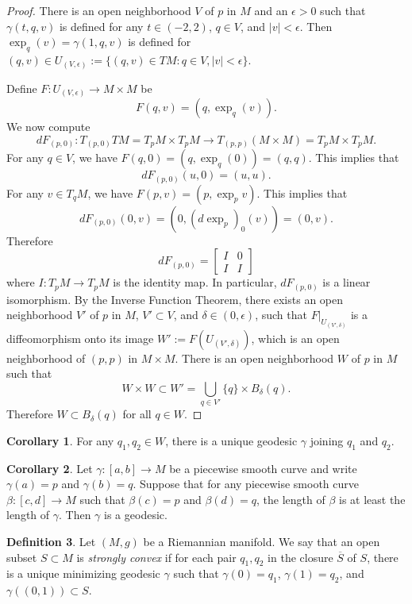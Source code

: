 \documentclass{amsart}
\numberwithin{equation}{section}
\theoremstyle{definition}
\newtheorem{definition}{Definition} [section]
\theoremstyle{theorem}
\newtheorem{corollary}[definition]{Corollary}
\begin{document}
\begin{proof}
There is an open neighborhood $V$ of $p$ in $M$ and an $\epsilon > 0$ such that $\gamma(t,q,v)$ is defined for any $t \in (-2,2)$,
$q\in V$, and $|v|<\epsilon$. Then $\exp_q(v) = \gamma(1, q,v)$ is defined for $(q,v)\in U_{(V,\epsilon)} := \{(q,v) \in TM : q \in V, |v| < \epsilon\}$. 

Define $F : U_{(V,\epsilon)}  \to M \times M$ be 
\[
F(q,v) = (q,\exp_q(v)).
\]
We now compute
$$
dF_{(p,0)}: T_{(p,0)}TM = T_p M\times T_p M \longrightarrow T_{(p,p)}(M\times M) = T_p M\times T_p M.
$$
For any $q \in V$, we have $F(q,0) = (q,\exp_q(0)) = (q,q)$. This implies that 
\[
dF_{(p,0)}(u,0) = (u,u).
\] 
For any $v \in T_qM$, we have $F(p,v) = (p, \exp_pv)$. This implies that 
\[
dF_{(p,0)}(0,v) = (0, (d\exp_p)_0(v)) = (0,v).
\]
Therefore  
\[
dF_{(p,0)} = \begin{bmatrix}
I & 0 \\ I & I 
\end{bmatrix}
\]
where $I: T_pM\to T_pM$ is the identity map. In particular, $dF_{(p,0)}$ is a linear isomorphism. By the Inverse Function Theorem,
there exists an open neighborhood $V'$ of $p$ in $M$, $V'\subset V$, and $\delta \in (0,\epsilon)$, such that
$F|_{U_{(V',\delta)}}$ is a diffeomorphism onto its image $W':= F(U_{(V',\delta)})$, which is an open neighborhood
of $(p,p)$ in $M\times M$.  There is an open neighborhood $W$ of $p$ in $M$ such that 
$$
W \times W \subset W'=\bigcup_{q\in V'}\{q\} \times B_\delta(q). 
$$
Therefore $W\subset B_\delta(q)$ for all $q\in W$.  
\end{proof}

\begin{corollary}
For any $q_1, q_2 \in W$, there is a unique geodesic $\gamma$ joining $q_1$ and $q_2$. 
\end{corollary}

\begin{corollary}
Let $\gamma : [a,b] \to M$ be a piecewise smooth curve and write $\gamma(a) = p$ and $\gamma(b) = q$. Suppose that for any piecewise smooth curve $\beta : [c,d] \to M$ such that $\beta(c) = p$ and $\beta(d) = q$, the length of $\beta$ is at least the length of $\gamma$. Then $\gamma$ is a geodesic. 
\end{corollary}


\begin{definition}
Let $(M,g)$ be a Riemannian manifold. We say that an open subset $S\subset M$ is {\em strongly convex} if for each pair 
$q_1, q_2$ in the closure $\overline{S}$ of $S$, 
there is a unique minimizing geodesic $\gamma$ such that $\gamma(0) = q_1$, $\gamma(1) = q_2$, 
and $\gamma((0,1)) \subset S$.
\end{definition}
\end{document}
